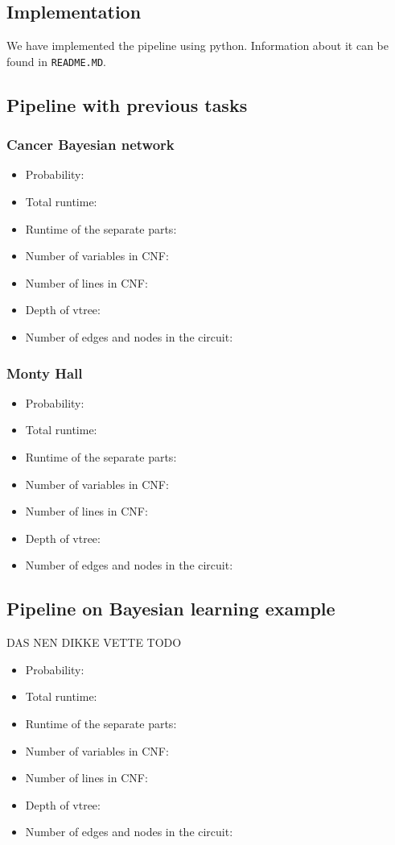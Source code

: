 \subsection{Implementation}
We have implemented the pipeline using python.
Information about it can be found in \texttt{README.MD}.

\subsection{Pipeline with previous tasks}
\subsubsection{Cancer Bayesian network}
\begin{itemize}
    \item Probability:
    \item Total runtime:
    \item Runtime of the separate parts:
    \item Number of variables in CNF:
    \item Number of lines in CNF:
    \item Depth of vtree:
    \item Number of edges and nodes in the circuit:
\end{itemize}
\subsubsection{Monty Hall}
\begin{itemize}
    \item Probability:
    \item Total runtime:
    \item Runtime of the separate parts:
    \item Number of variables in CNF:
    \item Number of lines in CNF:
    \item Depth of vtree:
    \item Number of edges and nodes in the circuit:
\end{itemize}

\subsection{Pipeline on Bayesian learning example}
DAS NEN DIKKE VETTE TODO
\begin{itemize}
    \item Probability:
    \item Total runtime:
    \item Runtime of the separate parts:
    \item Number of variables in CNF:
    \item Number of lines in CNF:
    \item Depth of vtree:
    \item Number of edges and nodes in the circuit:
\end{itemize}

